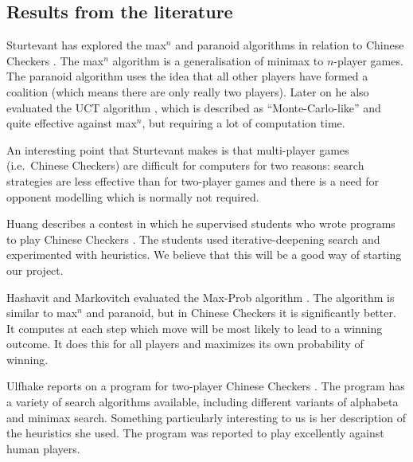 \documentclass[a4paper,11pt]{article}
\begin{document}
\subsection{Results from the literature}
Sturtevant has explored the max$^n$ and paranoid algorithms in
relation to Chinese Checkers
\cite{springerlink:10.1007/978-3-540-40031-8_8}. The max$^n$ algorithm
is a generalisation of minimax to $n$-player games. The paranoid
algorithm uses the idea that all other players have formed a coalition
(which means there are only really two players). Later on he also
evaluated the UCT algorithm
\cite{springerlink:10.1007/978-3-540-87608-3_4}, which is described as
``Monte-Carlo-like'' and quite effective against max$^n$, but
requiring a lot of computation time.

An interesting point that Sturtevant makes is that multi-player games
(i.e.~Chinese Checkers) are difficult for computers for two reasons:
search strategies are less effective than for two-player games and
there is a need for opponent modelling which is normally not required.

Huang describes a contest in which he supervised students who wrote
programs to play Chinese Checkers \cite{Huang:2001:SGP:378593.378708}.
The students used iter\-ative-deep\-ening search and experimented with
heuristics. We believe that this will be a good way of starting our
project.

Hashavit and Markovitch evaluated the Max-Prob algorithm
\cite{Hashavit}. The algorithm is similar to max$^n$ and paranoid, but
in Chinese Checkers it is significantly better. It computes at each
step which move will be most likely to lead to a winning outcome. It
does this for all players and maximizes its own probability of
winning.

Ulfhake reports on a program for two-player Chinese Checkers
\cite{ulfhake}. The program has a variety of search algorithms
available, including different variants of alphabeta and minimax
search. Something particularly interesting to us is her description of
the heuristics she used. The program was reported to play excellently
against human players.

\end{document}
